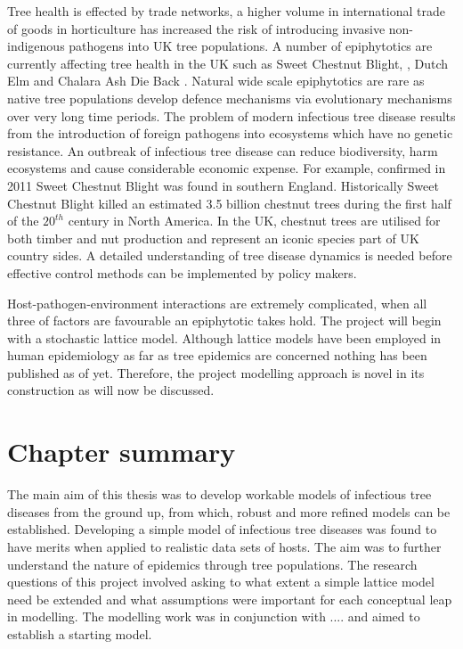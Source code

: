 Tree health is effected by trade networks, a higher volume in international trade of goods in horticulture has increased the risk of introducing invasive non-indigenous pathogens into UK tree populations. A number of epiphytotics are currently affecting tree health in the UK such as Sweet Chestnut Blight, \cite{MITCHELL201495, CB}, Dutch Elm \cite{DUTCH_ELM1,DUTCH_ELM2} and Chalara Ash Die Back \cite{ADB}. Natural wide scale epiphytotics are rare as native tree populations develop defence mechanisms via evolutionary mechanisms over very long time periods. The problem of modern infectious tree disease results from the introduction of foreign pathogens into ecosystems which have no genetic resistance. An outbreak of infectious tree disease can reduce biodiversity, harm ecosystems and cause considerable economic expense. For example, confirmed in 2011 Sweet Chestnut Blight was found in southern England. Historically Sweet Chestnut Blight killed an estimated 3.5 billion chestnut trees during the first half of the $20^{th}$ century in North America. In the UK, chestnut trees are utilised for both timber and nut production and represent an iconic species part of UK country sides. A detailed understanding of tree disease dynamics is needed before effective control methods can be implemented by policy makers.

Host-pathogen-environment interactions are extremely complicated, when all three of factors are favourable an epiphytotic takes hold. The project will begin with a stochastic lattice model. Although lattice models have been employed in human epidemiology as far as tree epidemics are concerned nothing has  been published as of yet. Therefore, the project modelling approach is novel in its construction as will now be discussed.


\section{Chapter summary}


The main aim of this thesis was to develop workable models of infectious tree diseases from the ground up, from which, robust and more refined models can be established. Developing a simple model of infectious tree diseases was found to have merits when applied to realistic data sets of hosts. The aim was to further understand the nature of epidemics through tree populations. The research questions of this project involved asking to what extent a simple lattice model need be extended and what assumptions were important for each conceptual leap in modelling. The modelling work was in conjunction with .... and aimed to establish a starting model.

